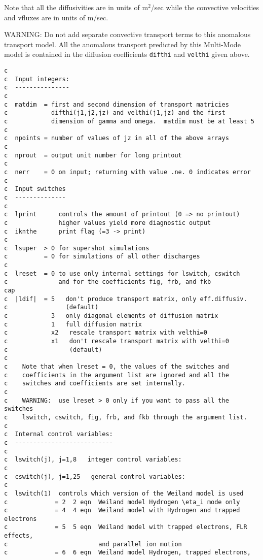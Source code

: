 Note that all the diffusivities are in units of m$^2$/sec while the
convective velocities and vfluxes are in units of m/sec.

WARNING:  Do not add separate convective transport terms to this
anomalous transport model.  All the anomalous transport
predicted by this Multi-Mode model is contained
in the diffusion coefficients {\tt difthi} and {\tt velthi} given
above.

\begin{verbatim}
c
c  Input integers:
c  ---------------
c
c  matdim  = first and second dimension of transport matricies
c            difthi(j1,j2,jz) and velthi(j1,jz) and the first
c            dimension of gamma and omega.  matdim must be at least 5
c
c  npoints = number of values of jz in all of the above arrays
c
c  nprout  = output unit number for long printout
c
c  nerr    = 0 on input; returning with value .ne. 0 indicates error
c
c  Input switches
c  --------------
c
c  lprint      controls the amount of printout (0 => no printout)
c              higher values yield more diagnostic output
c  iknthe      print flag (=3 -> print)
c
c  lsuper  > 0 for supershot simulations
c          = 0 for simulations of all other discharges
c
c  lreset  = 0 to use only internal settings for lswitch, cswitch
c              and for the coefficients fig, frb, and fkb
cap
c  |ldif|  = 5   don't produce transport matrix, only eff.diffusiv.
c                (default)
c            3   only diagonal elements of diffusion matrix
c            1   full diffusion matrix
c            x2   rescale transport matrix with velthi=0
c            x1   don't rescale transport matrix with velthi=0
c                 (default)
c
c    Note that when lreset = 0, the values of the switches and
c    coefficients in the argument list are ignored and all the
c    switches and coefficients are set internally.
c
c    WARNING:  use lreset > 0 only if you want to pass all the switches
c    lswitch, cswitch, fig, frb, and fkb through the argument list.
c
c  Internal control variables:
c  ---------------------------
c
c  lswitch(j), j=1,8   integer control variables:
c
c  cswitch(j), j=1,25   general control variables:
c
c  lswitch(1)  controls which version of the Weiland model is used
c             = 2  2 eqn  Weiland model Hydrogen \eta_i mode only
c             = 4  4 eqn  Weiland model with Hydrogen and trapped electrons
c             = 5  5 eqn  Weiland model with trapped electrons, FLR effects,
c                         and parallel ion motion
c             = 6  6 eqn  Weiland model Hydrogen, trapped electrons,

\end{verbatim}
